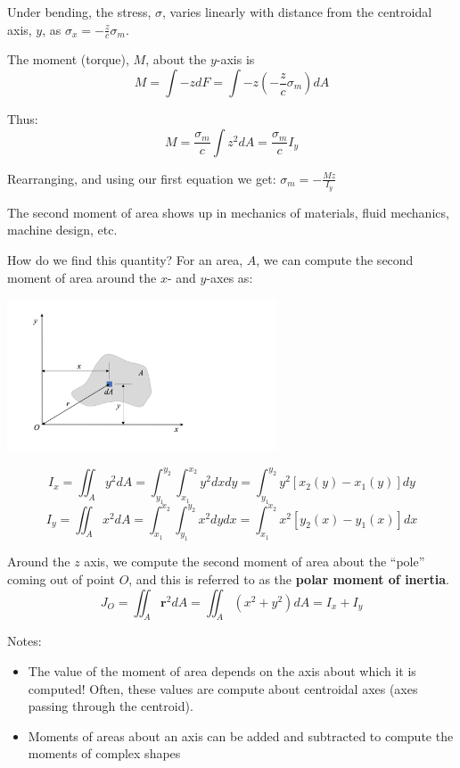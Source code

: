 \documentclass[12pt,letterpaper,twoside]{report}
\begin{document}
Under bending, the stress, $\sigma$, varies linearly with distance from the centroidal axis, $y$, as $\displaystyle \sigma_x = - \frac{z}{c} \sigma_m$. 

The moment (torque), $M$, about the $y$-axis is 
\[
\displaystyle M = \int -z dF = \int -z (- \frac{z}{c} \sigma_m) dA
\]  

Thus: 
\[
\displaystyle M = \frac{\sigma_m}{c} \int z^2 dA = \frac{\sigma_m}{c} I_y
\]

Rearranging, and using our first equation we get: $\displaystyle \sigma_m = - \frac{M z}{I_y}$

The second moment of area shows up in mechanics of materials, fluid mechanics, machine design, etc.

How do we find this quantity? For an area, $A$, we can compute the second moment of area around the $x$- and $y$-axes as: 

\includegraphics[trim={1cm 1cm 4cm 1cm},clip,width=0.6\textwidth, left]{Slide42} 

\[
\displaystyle I_x =   \iint_A y^2 dA = \int_{y_1}^{y_2} \int_{x_1}^{x_2} y^2 dx dy = \int_{y_1}^{y_2} y^2 [x_2(y) - x_1(y)] dy
\]
\[
\displaystyle I_y =  \iint_A x^2 dA = \int_{x_1}^{x_2} \int_{y_1}^{y_2} x^2 dy dx = \int_{x_1}^{x_2} x^2 [y_2(x) - y_1(x)] dx
\]

Around the $z$ axis, we compute the second moment of area about the “pole” coming out of point $O$, and this is referred to as the \textbf{polar moment of inertia}.  
\[
\displaystyle J_O =  \iint_A \bm{r}^2 dA =  \iint_A (x^2 + y^2) dA = I_x + I_y
\]

Notes:  
\begin{itemize}
\item The value of the moment of area depends on the axis about which it is computed!  Often, these values are compute about centroidal axes (axes passing through the centroid).
\item Moments of areas about an axis can be added and subtracted to compute the moments of complex shapes

\end{itemize}
\end{document}
